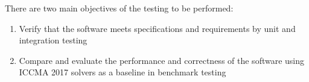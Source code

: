 There are two main objectives of the testing to be performed:
\begin{enumerate}
	\item{Verify that the software meets specifications and requirements by unit and integration testing}
	\item{Compare and evaluate the performance and correctness of the software using ICCMA 2017 solvers as a baseline in benchmark testing}
\end{enumerate}
